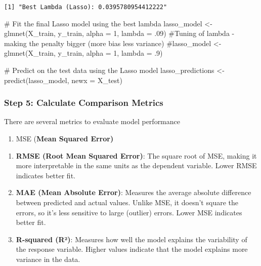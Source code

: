 \documentclass[
  letterpaper,
  DIV=11,
  numbers=noendperiod]{scrartcl}
\newenvironment{Shaded}{\begin{snugshade}}{\end{snugshade}}
\newcommand{\AttributeTok}[1]{\textcolor[rgb]{0.40,0.45,0.13}{#1}}
\newcommand{\CommentTok}[1]{\textcolor[rgb]{0.37,0.37,0.37}{#1}}
\newcommand{\DecValTok}[1]{\textcolor[rgb]{0.68,0.00,0.00}{#1}}
\newcommand{\FunctionTok}[1]{\textcolor[rgb]{0.28,0.35,0.67}{#1}}
\newcommand{\NormalTok}[1]{\textcolor[rgb]{0.00,0.23,0.31}{#1}}
\newcommand{\OtherTok}[1]{\textcolor[rgb]{0.00,0.23,0.31}{#1}}
\providecommand{\tightlist}{%
  \setlength{\itemsep}{0pt}\setlength{\parskip}{0pt}}\usepackage{longtable,booktabs,array}
\begin{document}
\begin{verbatim}
[1] "Best Lambda (Lasso): 0.0395780954412222"
\end{verbatim}

\begin{Shaded}
\begin{Highlighting}[]
\CommentTok{\# Fit the final Lasso model using the best lambda}
\NormalTok{lasso\_model }\OtherTok{\textless{}{-}} \FunctionTok{glmnet}\NormalTok{(X\_train, y\_train, }\AttributeTok{alpha =} \DecValTok{1}\NormalTok{, }\AttributeTok{lambda =}\NormalTok{ .}\DecValTok{09}\NormalTok{)}
\CommentTok{\#Tuning of lambda {-} making the penalty bigger (more bias less variance)}
\CommentTok{\#lasso\_model \textless{}{-} glmnet(X\_train, y\_train, alpha = 1, lambda = .9)}


\CommentTok{\# Predict on the test data using the Lasso model}
\NormalTok{lasso\_predictions }\OtherTok{\textless{}{-}} \FunctionTok{predict}\NormalTok{(lasso\_model, }\AttributeTok{newx =}\NormalTok{ X\_test)}
\end{Highlighting}
\end{Shaded}

\hypertarget{step-5-calculate-comparison-metrics}{%
\subsubsection{Step 5: Calculate Comparison
Metrics}\label{step-5-calculate-comparison-metrics}}

There are several metrics to evaluate model performance

\begin{enumerate}
\def\labelenumi{\arabic{enumi}.}
\tightlist
\item
  MSE (\textbf{Mean Squared Error)}
\end{enumerate}

\begin{enumerate}
\def\labelenumi{\arabic{enumi}.}
\setcounter{enumi}{1}
\item
  \textbf{RMSE (Root Mean Squared Error)}: The square root of MSE,
  making it more interpretable in the same units as the dependent
  variable. Lower RMSE indicates better fit.
\item
  \textbf{MAE (Mean Absolute Error)}: Measures the average absolute
  difference between predicted and actual values. Unlike MSE, it doesn't
  square the errors, so it's less sensitive to large (outlier) errors.
  Lower MSE indicates better fit.
\item
  \textbf{R-squared (R²)}: Measures how well the model explains the
  variability of the response variable. Higher values indicate that the
  model explains more variance in the data.
\end{enumerate}
\end{document}
